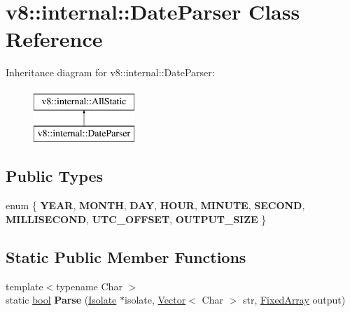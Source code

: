 \hypertarget{classv8_1_1internal_1_1DateParser}{}\section{v8\+:\+:internal\+:\+:Date\+Parser Class Reference}
\label{classv8_1_1internal_1_1DateParser}
Inheritance diagram for v8\+:\+:internal\+:\+:Date\+Parser\+:\begin{figure}[H]
\begin{center}
\leavevmode
\includegraphics[height=2.000000cm]{classv8_1_1internal_1_1DateParser}
\end{center}
\end{figure}
\subsection*{Public Types}
\begin{DoxyCompactItemize}
\item 
\mbox{\label{classv8_1_1internal_1_1DateParser_a7a77826c68d931719d63fcae48f2a4a5}} 
enum \{ \newline
{\bfseries Y\+E\+AR}, 
{\bfseries M\+O\+N\+TH}, 
{\bfseries D\+AY}, 
{\bfseries H\+O\+UR}, 
\newline
{\bfseries M\+I\+N\+U\+TE}, 
{\bfseries S\+E\+C\+O\+ND}, 
{\bfseries M\+I\+L\+L\+I\+S\+E\+C\+O\+ND}, 
{\bfseries U\+T\+C\+\_\+\+O\+F\+F\+S\+ET}, 
\newline
{\bfseries O\+U\+T\+P\+U\+T\+\_\+\+S\+I\+ZE}
 \}
\end{DoxyCompactItemize}
\subsection*{Static Public Member Functions}
\begin{DoxyCompactItemize}
\item 
\mbox{\label{classv8_1_1internal_1_1DateParser_ad0323f8d69695d6f9969eac0f629f24b}} 
{\footnotesize template$<$typename Char $>$ }\\static \mbox{\hyperlink{classbool}{bool}} {\bfseries Parse} (\mbox{\hyperlink{classv8_1_1internal_1_1Isolate}{Isolate}} $\ast$isolate, \mbox{\hyperlink{classv8_1_1internal_1_1Vector}{Vector}}$<$ Char $>$ str, \mbox{\hyperlink{classv8_1_1internal_1_1FixedArray}{Fixed\+Array}} output)
\end{DoxyCompactItemize}


